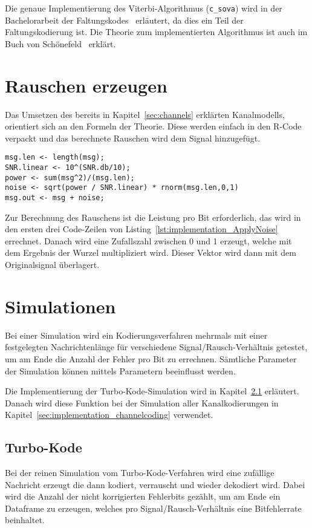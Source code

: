 Die genaue Implementierung des Viterbi-Algorithmus (\texttt{c\_sova}) wird in der Bachelorarbeit der Faltungskodes~\cite[S.~26~ff.]{nocker} erläutert, da dies ein Teil der Faltungskodierung ist. Die Theorie zum implementierten Algorithmus ist auch im Buch von Schönefeld~\cite[222-233]{schoenfeld2012informations} erklärt.

\FloatBarrier
\section{Rauschen erzeugen}
\label{sec:implementation_applyNoise}
Das Umsetzen des bereits in Kapitel~\ref{sec:channels} erklärten Kanalmodells, orientiert sich an den Formeln der Theorie. Diese werden einfach in den R-Code verpackt und das berechnete Rauschen wird dem Signal hinzugefügt.  

\begin{lstlisting}[caption=Implementierung von \texttt{ApplyNoise}, label={lst:implementation_ApplyNoise}, float=!th]
msg.len <- length(msg);
SNR.linear <- 10^(SNR.db/10);
power <- sum(msg^2)/(msg.len); 
noise <- sqrt(power / SNR.linear) * rnorm(msg.len,0,1)
msg.out <- msg + noise;
\end{lstlisting}

Zur Berechnung des Rauschens ist die Leistung pro Bit erforderlich, das wird in den ersten drei Code-Zeilen von Listing~\ref{lst:implementation_ApplyNoise} errechnet. Danach wird eine Zufallszahl zwischen 0 und 1 erzeugt, welche mit dem Ergebnis der Wurzel multipliziert wird. Dieser Vektor wird dann mit dem Originalsignal überlagert.

\FloatBarrier
\section{Simulationen}
\label{sec:implementation_simulation}
Bei einer Simulation wird ein Kodierungsverfahren mehrmals mit einer festgelegten Nachrichtenlänge für verschiedene Signal/Rausch-Verhältnis getestet, um am Ende die Anzahl der Fehler pro Bit zu errechnen. Sämtliche Parameter der Simulation können mittels Parametern beeinflusst werden.

Die Implementierung der Turbo-Kode-Simulation wird in Kapitel~\ref{sec:implementation_turbo} erläutert. Danach wird diese Funktion bei der Simulation aller Kanalkodierungen in Kapitel~\ref{sec:implementation_channelcoding} verwendet.

\subsection{Turbo-Kode}
\label{sec:implementation_turbo}
Bei der reinen Simulation vom Turbo-Kode-Verfahren wird eine zufällige Nachricht erzeugt die dann kodiert, verrauscht und wieder dekodiert wird. Dabei wird die Anzahl der nicht korrigierten Fehlerbits gezählt, um am Ende ein Dataframe zu erzeugen, welches pro Signal/Rausch-Verhältnis eine Bitfehlerrate beinhaltet.

